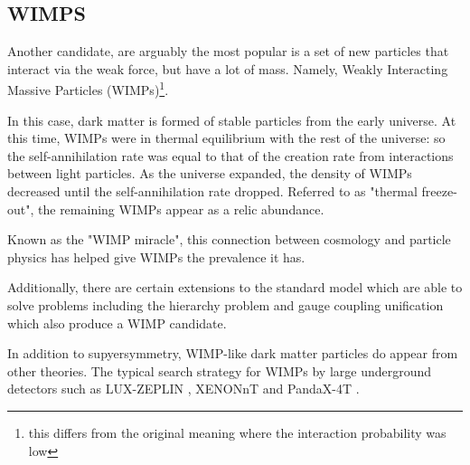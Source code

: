 \subsection{WIMPS}
\label{sec:wimp_as_a_candidate}
\par
Another candidate, are arguably the most popular is a set of new particles that interact via the weak force, but have a lot of mass.
Namely, Weakly Interacting Massive Particles (WIMPs)\footnote{this differs from the original meaning where the interaction probability was low}. 
\par
In this case, dark matter is formed of stable particles from the early universe.
At this time, WIMPs were in thermal equilibrium with the rest of the universe: so the self-annihilation rate was equal to that of the creation rate from interactions between light particles.
As the universe expanded, the density of WIMPs decreased until the self-annihilation rate dropped.
Referred to as "thermal freeze-out", the remaining WIMPs appear as a relic abundance. 




\par
Known as the "WIMP miracle", this connection between cosmology and particle physics has helped give WIMPs the prevalence it has.


\par
Additionally, there are certain extensions to the standard model which are able to solve problems including the hierarchy problem and gauge coupling unification which also produce a WIMP candidate.


\par
In addition to supyersymmetry, WIMP-like dark matter particles do appear from other theories.
The typical search strategy for WIMPs by large underground detectors such as LUX-ZEPLIN \cite{LZ_TechnicalDesignReview_ref}, XENONnT \cite{xenonnt_projected_sensitivty_ref} and PandaX-4T \cite{pandax_4t_ref}.